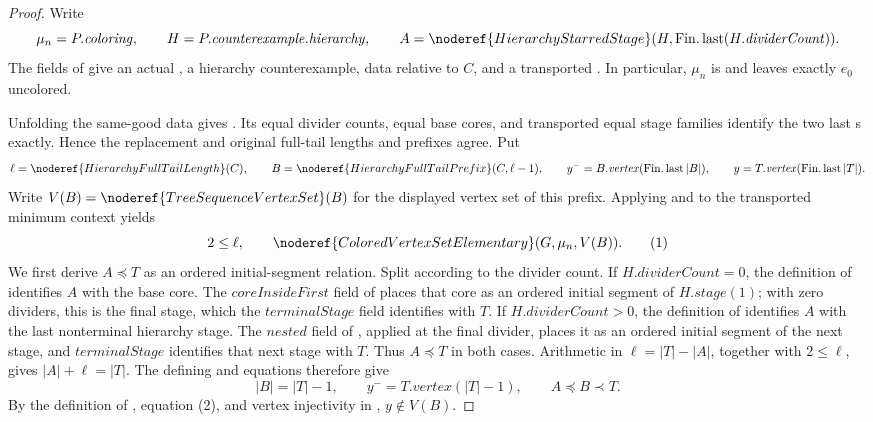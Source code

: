 \begin{proof}
Write
\[
 \mu_n=P.\mathit{coloring},\qquad
 H=P.\mathit{counterexample}.\mathit{hierarchy},\qquad
 A=\noderef{HierarchyStarredStage}
      (H,\operatorname{Fin.last}(H.\mathit{dividerCount})).
\]
The fields of  give an actual
, a hierarchy counterexample,
 data relative to \(C\), and a transported
.  In particular,
\(\mu_n\) is  and
 leaves exactly \(e_0\) uncolored.

Unfolding the same-good data gives
.  Its equal divider counts, equal base cores,
and transported equal stage families identify the two last
s exactly.  Hence the replacement and
original full-tail lengths and prefixes agree.  Put
\[
 \ell=\noderef{HierarchyFullTailLength}(C),\qquad
 B=\noderef{HierarchyFullTailPrefix}(C,\ell-1),
 \qquad y^-=B.\mathit{vertex}(\operatorname{Fin.last}|B|),
 \qquad y=T.\mathit{vertex}(\operatorname{Fin.last}|T|).
\]
Write \(V(B)=\noderef{TreeSequenceVertexSet}(B)\) for the displayed
vertex set of this prefix.
Applying  and
 to the transported
minimum context yields
\[
 2\leq\ell,\qquad
 \noderef{ColoredVertexSetElementary}(G,\mu_n,V(B)).           \tag{1}
\]
We first derive \(A\preccurlyeq T\) as an ordered initial-segment
relation.  Split according to the divider count.  If
\(H.\mathit{dividerCount}=0\), the definition of
 identifies \(A\) with the base core.
The \(\mathit{coreInsideFirst}\) field of
 places that core as an ordered initial
segment of \(H.\mathit{stage}(1)\); with zero dividers, this is the final
stage, which the \(\mathit{terminalStage}\) field identifies with \(T\).
If \(H.\mathit{dividerCount}>0\), the definition of
 identifies \(A\) with the last
nonterminal hierarchy stage.  The \(\mathit{nested}\) field of
, applied at the final divider, places it as
an ordered initial segment of the next stage, and
\(\mathit{terminalStage}\) identifies that next stage with \(T\).
Thus \(A\preccurlyeq T\) in both cases.  Arithmetic in
\(\ell=|T|-|A|\), together with \(2\leq\ell\), gives
\(|A|+\ell=|T|\).  The defining
 and
 equations therefore give
\[
 |B|=|T|-1,\qquad
 y^-=T.\mathit{vertex}(|T|-1),\qquad A\preccurlyeq B\prec T.  \tag{2}
\]
By the definition of , equation (2), and
vertex injectivity in , \(y\notin V(B)\).


\end{proof}

